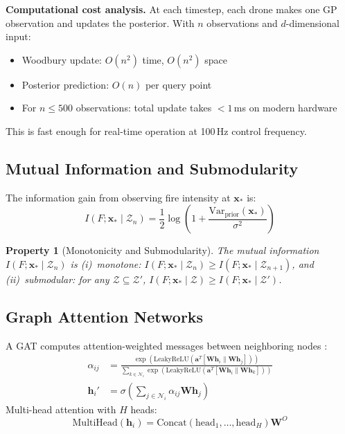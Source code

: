 \documentclass[12pt,a4paper]{article}
\DeclareRobustCommand{\cN}{\mathcal{N}}
\DeclareRobustCommand{\cZ}{\mathcal{Z}}
\DeclareRobustCommand{\vect}[1]{\bm{#1}}
\DeclareRobustCommand{\mat}[1]{\bm{#1}}
\newcommand{\LeakyReLU}{\mathrm{LeakyReLU}}
\newtheorem{property}[theorem]{Property}
\begin{document}
\textbf{Computational cost analysis.} At each timestep, each drone makes one GP observation and updates the posterior. With $n$ observations and $d$-dimensional input:
\begin{itemize}[leftmargin=*]
    \item Woodbury update: $O(n^2)$ time, $O(n^2)$ space
    \item Posterior prediction: $O(n)$ per query point
    \item For $n \leq 500$ observations: total update takes $< 1$\,ms on modern hardware
\end{itemize}
This is fast enough for real-time operation at 100\,Hz control frequency.

\subsection{Mutual Information and Submodularity}

The information gain from observing fire intensity at $\vect{x}_*$ is:
\begin{equation}
    I(F; \vect{x}_* \mid \cZ_n) = \frac{1}{2}\log\left(1 + \frac{\text{Var}_{\text{prior}}(\vect{x}_*)}{\sigma^2}\right)
    \label{eq:info_gain}
\end{equation}

\begin{property}[Monotonicity and Submodularity]
\label{prop:submodular}
The mutual information $I(F; \vect{x}_* \mid \cZ_n)$ is (i)~monotone: $I(F; \vect{x}_* \mid \cZ_n) \geq I(F; \vect{x}_* \mid \cZ_{n+1})$, and (ii)~submodular: for any $\cZ \subseteq \cZ'$, $I(F; \vect{x}_* \mid \cZ) \geq I(F; \vect{x}_* \mid \cZ')$.
\end{property}

\subsection{Graph Attention Networks}

A GAT computes attention-weighted messages between neighboring nodes \cite{Rizk2019}:
\begin{align}
    \alpha_{ij} &= \frac{\exp(\LeakyReLU(\vect{a}^T [\mat{W}\vect{h}_i \| \mat{W}\vect{h}_j]))}{\sum_{k \in \cN_i} \exp(\LeakyReLU(\vect{a}^T [\mat{W}\vect{h}_i \| \mat{W}\vect{h}_k]))} \label{eq:attention}\\
    \vect{h}_i' &= \sigma\left(\sum_{j \in \cN_i} \alpha_{ij} \mat{W}\vect{h}_j\right) \label{eq:gat_update}
\end{align}
Multi-head attention with $H$ heads:
\begin{equation}
    \text{MultiHead}(\vect{h}_i) = \text{Concat}(\text{head}_1, \ldots, \text{head}_H) \mat{W}^O
\end{equation}
\end{document}
